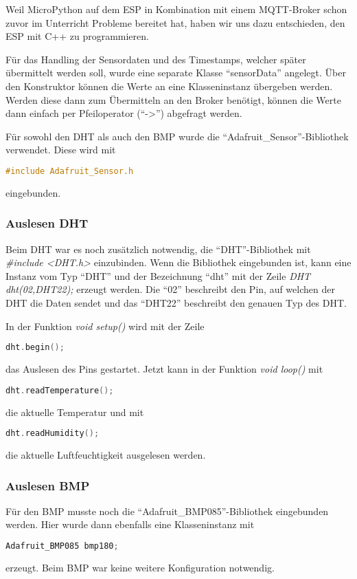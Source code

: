 Weil MicroPython auf dem ESP in Kombination mit einem MQTT-Broker schon 
zuvor im Unterricht Probleme bereitet hat, haben wir uns dazu entschieden, den ESP mit C++ zu programmieren.

Für das Handling der Sensordaten und des Timestamps, welcher später übermittelt werden soll, wurde eine separate Klasse "`sensorData"' angelegt.
Über den Konstruktor können die Werte an eine Klasseninstanz übergeben werden. 
Werden diese dann zum Übermitteln an den Broker benötigt, können die Werte dann einfach per Pfeiloperator ("`->"') abgefragt werden.

Für sowohl den DHT als auch den BMP wurde die "`Adafruit\_Sensor"'-Bibliothek verwendet.
Diese wird mit 
\begin{lstlisting}[language=C++]
	#include Adafruit_Sensor.h
\end{lstlisting}
eingebunden.

\subsubsection{Auslesen DHT}
	Beim DHT war es noch zusätzlich notwendig, die "`DHT"'-Bibliothek mit \textit{\#include <DHT.h>} einzubinden.
	Wenn die Bibliothek eingebunden ist, kann eine Instanz vom Typ "`DHT"' und der Bezeichnung "`dht"' mit der Zeile \textit{DHT dht(02,DHT22);} erzeugt werden.
	Die "`02"' beschreibt den Pin, auf welchen der DHT die Daten sendet und das "`DHT22"' beschreibt den genauen Typ des DHT.
	
	In der Funktion \textit{void setup()} wird mit der Zeile
\begin{lstlisting}[language=C++]
	dht.begin();
\end{lstlisting}
	das Auslesen des Pins gestartet. 
	Jetzt kann in der Funktion \textit{void loop()} mit 
\begin{lstlisting}[language=C++]
	dht.readTemperature();
\end{lstlisting}
	die aktuelle Temperatur und mit
\begin{lstlisting}[language=C++]
	dht.readHumidity();
\end{lstlisting}
	die aktuelle Luftfeuchtigkeit ausgelesen werden.
	
\subsubsection{Auslesen BMP}
	Für den BMP musste noch die "`Adafruit\_BMP085"'-Bibliothek eingebunden werden.
	Hier wurde dann ebenfalls eine Klasseninstanz mit 
\begin{lstlisting}[language=C++]
	Adafruit_BMP085 bmp180;
\end{lstlisting}
	erzeugt. Beim BMP war keine weitere Konfiguration notwendig.
	
